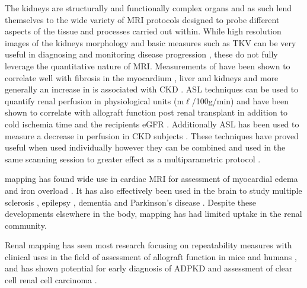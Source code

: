 The kidneys are structurally and functionally complex organs and as such lend themselves to the wide variety of MRI protocols designed to probe different aspects of the tissue and processes carried out within. While high resolution images of the kidneys morphology and basic measures such as \ac{TKV} can be very useful in diagnosing and monitoring disease progression \cite{buchanan_quantitative_2019, chapman_kidney_2012, gong_relationship_2012}, these do not fully leverage the quantitative nature of \ac{MRI}. Measurements of \tone have been shown to correlate well with fibrosis in the myocardium \cite{bull_human_2013, ferreira_t1_2013}, liver \cite{hoad_study_2015, luetkens_quantification_2018} and kidneys \cite{friedli_new_2016} and more generally an increase in \tone is associated with \ac{CKD} \cite{gillis_non-contrast_2016, cox_multiparametric_2017, buchanan_quantitative_2019}. \ac{ASL} techniques can be used to quantify renal perfusion in physiological units (m$\ell$/100g/min) and have been shown to correlate with allograft function post renal transplant in addition to cold ischemia time and the recipients \ac{eGFR} \cite{hueper_functional_2015, artz_arterial_2011, ren_evaluation_2016, niles_longitudinal_2016}. Additionally \ac{ASL} has been used to measure a decrease in perfusion in \ac{CKD} subjects \cite{gillis_non-contrast_2016, rossi_histogram_2012, tan_renal_2014}. These techniques have proved useful when used individually however they can be combined and used in the same scanning session to greater effect as a multiparametric protocol \cite{buchanan_quantitative_2019, cox_multiparametric_2017, eckerbom_multiparametric_2019, schley_multiparametric_2018, hueper_kidney_2016}.

\ttwo mapping has found wide use in cardiac \ac{MRI} for assessment of myocardial edema \cite{gouya_rapidly_2008, giri_t2_2009, nasenstein_cardiac_2014} and iron overload \cite{guo_myocardial_2009, krittayaphong_detection_2017}. It has also effectively been used in the brain to study multiple sclerosis \cite{neema_t1-_2007}, epilepsy \cite{rugg-gunn_whole-brain_2005}, dementia \cite{knight_quantitative_2016} and Parkinson’s disease \cite{vymazal_t1_1999}. Despite these developments elsewhere in the body, \ttwo mapping has had limited uptake in the renal community.

Renal \ttwo mapping has seen most research focusing on repeatability measures \cite{de_bazelaire_mr_2004, zhang_reproducibility_2011, li_measuring_2015, de_boer_multiparametric_2020} with clinical uses in the field of assessment of allograft function in mice \cite{hueper_kidney_2016} and humans \cite{mathys_t2_2011, adams_multiparametric_2020}, and has shown potential for early diagnosis of \ac{ADPKD} \cite{franke_magnetic_2017} and assessment of clear cell renal cell carcinoma \cite{adams_use_2019}.

